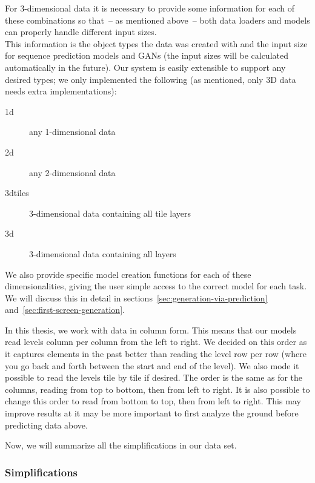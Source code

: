 For 3-dimensional data it is necessary to provide some information for
each of these combinations so that~-- as mentioned above~-- both data
loaders and models can properly handle different input sizes. \\
This information is the object types the data was created with and the
input size for sequence prediction models and GANs (the input sizes
will be calculated automatically in the future). Our system is easily
extensible to support any desired types; we only implemented the
following (as mentioned, only 3D data needs extra implementations):
\begin{description}
\item[1d] any 1-dimensional data
\item[2d] any 2-dimensional data
\item[3dtiles] 3-dimensional data containing all tile layers
\item[3d] 3-dimensional data containing all layers
\end{description}
We also provide specific model creation functions for each of these
dimensionalities, giving the user simple access to the correct model
for each task. We will discuss this in detail in
sections~\ref{sec:generation-via-prediction}
and~\ref{sec:first-screen-generation}.

In this thesis, we work with data in column form. This means that our
models read levels column per column from the left to right. We
decided on this order as it captures elements in the past better than
reading the level row per row (where you go back and forth between the
start and end of the level). We also mode it possible to read the
levels tile by tile if desired. The order is the same as for the
columns, reading from top to bottom, then from left to right. It is
also possible to change this order to read from bottom to top, then
from left to right. This may improve results at it may be more
important to first analyze the ground before predicting data above.

Now, we will summarize all the simplifications in our data set.

\subsubsection{Simplifications}

